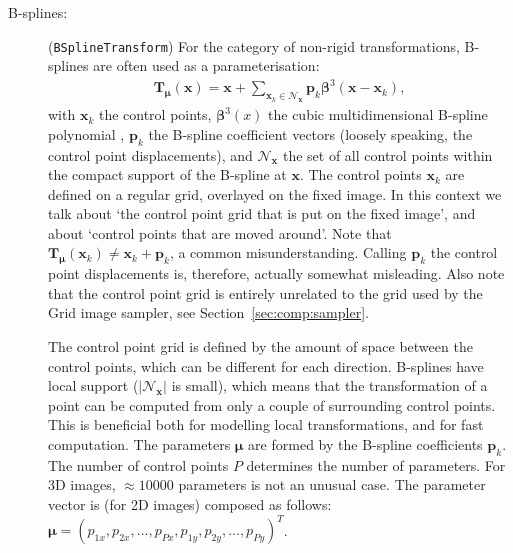 \documentclass[]{report}
\newcommand{\vx}{\bm{x}}
\newcommand{\vmu}{\bm{\mu}}
\newcommand{\vTm}{\bm{T}_{\vmu}}
\newcommand{\vTmx}{\bm{T}_{\vmu}(\bm{x})}
\newcommand{\Ncal}{\mathcal{N}}
\begin{document}
\begin{description}
\item[B-splines:] (\texttt{BSplineTransform}) For the category of non-rigid
    transformations, B-splines \citep{RueckertEA99} are often used as a
    parameterisation:
\begin{align}
\vTmx = \vx + \sum_{\vx_k \in \Ncal_{\vx}} \bm{p}_k \bm{\beta}^3(\vx
- \vx_k),\label{eq:bspline}
\end{align}
with $\vx_k$ the control points, $\bm{\beta}^3(x)$ the cubic
multidimensional B-spline polynomial \citep{Unser99}, $\bm{p}_k$ the
B-spline coefficient vectors (loosely speaking, the control point
displacements), and $\Ncal_{\vx}$ the set of all control points within the
compact support of the B-spline at $\vx$. The control points $\vx_k$ are
defined on a regular grid, overlayed on the fixed image. In this context we
talk about `the control point grid that is put on the fixed image', and
about `control points that are moved around'. Note that $\vTm(\vx_k)\neq
\vx_k + \bm{p}_k$, a common misunderstanding. Calling $\bm{p}_k$ the
control point displacements is, therefore, actually somewhat misleading.
Also note that the control point grid is entirely unrelated to the grid
used by the Grid image sampler, see Section~\ref{sec:comp:sampler}.

The control point grid is defined by the amount of space between the
control points, which can be different for each direction. B-splines
have local support ($|\Ncal_{\vx}|$ is small), which means that the
transformation of a point can be computed from only a couple of
surrounding control points. This is beneficial both for modelling
local transformations, and for fast computation. The parameters
$\vmu$ are formed by the B-spline coefficients $\bm{p}_k$. The
number of control points $P$ determines the number of parameters.
For 3D images, $\approx 10000$ parameters is not an unusual case.
The parameter vector is (for 2D images) composed as follows: $\vmu =
(p_{1x}, p_{2x}, \ldots, p_{Px}, p_{1y}, p_{2y}, \ldots, p_{Py}
)^T$.



\end{description}
\end{document}
